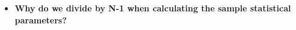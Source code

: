 \documentclass[11pt]{article}
\begin{document}
\begin{itemize}
\begin{itemize}
\newpage

\item \textbf{\Large Why do we divide by N-1 when calculating the sample statistical parameters? }
\end{itemize}

	\end{itemize}
\end{document}
